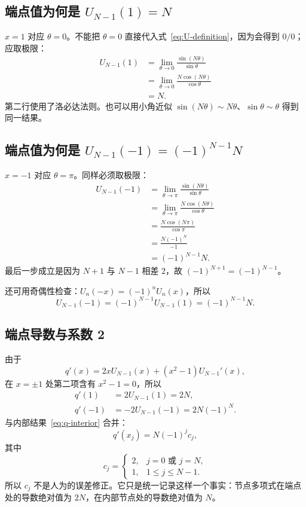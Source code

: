 \documentclass[11pt,a4paper]{ctexart}
\numberwithin{equation}{section}
\begin{document}
\subsection{端点值为何是 $U_{N-1}(1)=N$}

$x=1$ 对应 $\theta=0$。不能把 $\theta=0$ 直接代入式~\eqref{eq:U-definition}，因为会得到 $0/0$；应取极限：
\begin{align}
  U_{N-1}(1)
  &=\lim_{\theta\to0}\frac{\sin(N\theta)}{\sin\theta}\\
  &=\lim_{\theta\to0}\frac{N\cos(N\theta)}{\cos\theta}\\
  &=N.
\end{align}
第二行使用了洛必达法则。也可以用小角近似 $\sin(N\theta)\sim N\theta$、$\sin\theta\sim\theta$ 得到同一结果。

\subsection{端点值为何是 $U_{N-1}(-1)=(-1)^{N-1}N$}

$x=-1$ 对应 $\theta=\pi$。同样必须取极限：
\begin{align}
  U_{N-1}(-1)
  &=\lim_{\theta\to\pi}\frac{\sin(N\theta)}{\sin\theta}\\
  &=\lim_{\theta\to\pi}\frac{N\cos(N\theta)}{\cos\theta}\\
  &=\frac{N\cos(N\pi)}{\cos\pi}\\
  &=\frac{N(-1)^N}{-1}\\
  &=(-1)^{N-1}N.
  \label{eq:U-minus-one}
\end{align}
最后一步成立是因为 $N+1$ 与 $N-1$ 相差 $2$，故 $(-1)^{N+1}=(-1)^{N-1}$。

还可用奇偶性检查：$U_n(-x)=(-1)^nU_n(x)$，所以
\begin{equation}
  U_{N-1}(-1)=(-1)^{N-1}U_{N-1}(1)=(-1)^{N-1}N.
\end{equation}

\subsection{端点导数与系数 2}

由于
\begin{equation}
  q'(x)=2xU_{N-1}(x)+(x^2-1)U_{N-1}'(x),
\end{equation}
在 $x=\pm1$ 处第二项含有 $x^2-1=0$，所以
\begin{align}
  q'(1)&=2U_{N-1}(1)=2N,\\
  q'(-1)&=-2U_{N-1}(-1)=2N(-1)^N.
\end{align}
与内部结果~\eqref{eq:q-interior} 合并：
\begin{equation}
  \boxed{q'(x_j)=N(-1)^jc_j},
\end{equation}
其中
\begin{equation}
  c_j=\begin{cases}2,&j=0\text{ 或 }j=N,\\1,&1\le j\le N-1.\end{cases}
\end{equation}
所以 $c_j$ 不是人为的误差修正。它只是统一记录这样一个事实：节点多项式在端点处的导数绝对值为 $2N$，在内部节点处的导数绝对值为 $N$。
\end{document}
